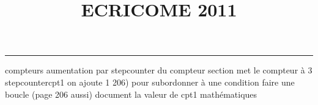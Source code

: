 \documentclass[11pt]{article}%
\title{\bf \vspace{-2cm} ECRICOME 2011} %
\author{} %
\date{} %
\begin{document}
\maketitle %
\vspace{-1.4cm}\hrule %
\thispagestyle{fancy}

\vspace*{.2cm}



compteurs%
aumentation par stepcounter du compteur section%
met le compteur à 3%
stepcounter{cpt1} on ajoute 1%
206) pour subordonner à une condition %
faire une boucle (page 206 aussi) %
document la valeur de cpt1 
mathématiques\newcommand{\ch}{\operatorname{ch}} 
\newcommand{\sh}{\operatorname{sh}}
\renewcommand{\tanh}{\operatorname{th}}
\renewcommand{\sinh}{\operatorname{sh}}
\renewcommand{\cosh}{\operatorname{ch}}
\newcommand{\argsh}{\operatorname{argsh}}
\newcommand{\argch}{\operatorname{argch}}
\newcommand{\argth}{\operatorname{argth}}
\newcommand{\ker}{\operatorname{Ker}}
\renewcommand{\im}{\operatorname{Im}}
\newcommand{\rg}{\operatorname{rg}}
\newcommand{\Id}{\operatorname{Id}}
\renewcommand{\leq}{\leq}
\renewcommand{\geq}{\geq }

\newcommand{\NN}{\mbox{${\mathbb N}$}}
\newcommand{\ZZ}{\mbox{${\mathbb Z}$}}
\newcommand{\QQ}{\mbox{${\mathbb Q}$}}
\newcommand{\RR}{\mbox{${\mathbb R}$}}
\newcommand{\MM}{\mbox{${\mathcal{M}}$}}
\newcommand{\CC}{\mbox{${\mathcal{C}}$}}
\newcommand{\DD}{\mbox{${\mathcal{D}}$}}
\end{document}
